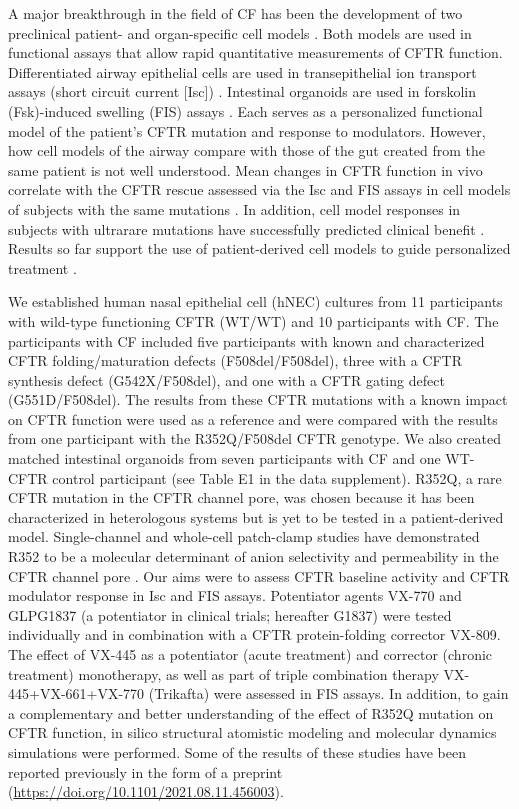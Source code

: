 A major breakthrough in the field of CF has been the development of two preclinical patient- and organ-specific cell models \cite{clarke2013, dekkers2016a, martinovich2017}. Both models are used in functional assays that allow rapid quantitative measurements of CFTR function. Differentiated airway epithelial cells are used in transepithelial ion transport assays (short circuit current [Isc]) \cite{pranke2017}. Intestinal organoids are used in forskolin (Fsk)-induced swelling (FIS) assays \cite{dekkers2013a}. Each serves as a personalized functional model of the patient’s CFTR mutation and response to modulators. However, how cell models of the airway compare with those of the gut created from the same patient is not well understood. Mean changes in CFTR function in vivo correlate with the CFTR rescue assessed via the Isc and FIS assays in cell models of subjects with the same mutations \cite{dekkers2016a, pranke2017}. In addition, cell model responses in subjects with ultrarare mutations have successfully predicted clinical benefit \cite{ramalho2021, mccarthy2018, berkers2019}. Results so far support the use of patient-derived cell models to guide personalized treatment \cite{pranke2019a}.

We established human nasal epithelial cell (hNEC) cultures from 11 participants with wild-type functioning CFTR (WT/WT) and 10 participants with CF. The participants with CF included five participants with known and characterized CFTR folding/maturation defects (F508del/F508del), three with a CFTR synthesis defect (G542X/F508del), and one with a CFTR gating defect (G551D/F508del). The results from these CFTR mutations with a known impact on CFTR function were used as a reference and were compared with the results from one participant with the R352Q/F508del CFTR genotype. We also created matched intestinal organoids from seven participants with CF and one WT-CFTR control participant (see Table E1 in the data supplement). R352Q, a rare CFTR mutation in the CFTR channel pore, was chosen because it has been characterized in heterologous systems but is yet to be tested in a patient-derived model. Single-channel and whole-cell patch-clamp studies have demonstrated R352 to be a molecular determinant of anion selectivity and permeability in the CFTR channel pore \cite{guinamard1999}. Our aims were to assess CFTR baseline activity and CFTR modulator response in Isc and FIS assays. Potentiator agents VX-770 and GLPG1837 (a potentiator in clinical trials; hereafter G1837) were tested individually and in combination with a CFTR protein-folding corrector VX-809. The effect of VX-445 as a potentiator (acute treatment) and corrector (chronic treatment) monotherapy, as well as part of triple combination therapy VX-445+VX-661+VX-770 (Trikafta) were assessed in FIS assays. In addition, to gain a complementary and better understanding of the effect of R352Q mutation on CFTR function, in silico structural atomistic modeling and molecular dynamics simulations were performed. Some of the results of these studies have been reported previously in the form of a preprint (\href{https://doi.org/10.1101/2021.08.11.456003}{https://doi.org/10.1101/2021.08.11.456003}).


